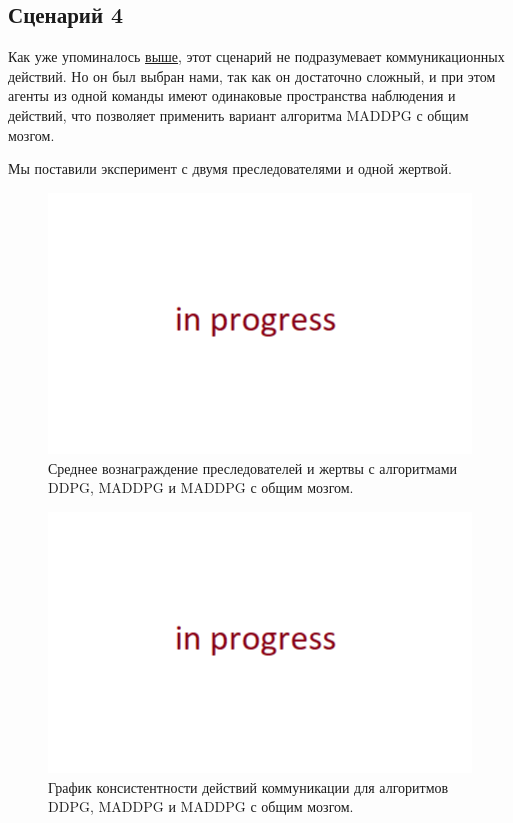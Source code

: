 \subsection{Сценарий 4}

Как уже упоминалось \hyperref[exp-st]{выше}, этот сценарий не подразумевает коммуникационных действий. Но он был выбран нами, так как он достаточно сложный, и при этом агенты из одной команды имеют одинаковые пространства наблюдения и действий, что позволяет применить вариант алгоритма MADDPG с общим мозгом.

Мы поставили эксперимент с двумя преследователями и одной жертвой.

\begin{figure}[ht!]
	\center
	\includegraphics [scale=0.6] {my_folder/images/in_progress.png}
	\caption{Среднее вознаграждение преследователей и жертвы с алгоритмами DDPG, MADDPG и MADDPG с общим мозгом.}
	\label{fig:result-st-rew}
\end{figure}

\begin{figure}[ht!]
	\center
	\includegraphics [scale=0.6] {my_folder/images/in_progress.png}
	\caption{График консистентности действий коммуникации для алгоритмов DDPG, MADDPG и MADDPG с общим мозгом.}
	\label{fig:result-st-comm}
\end{figure}
